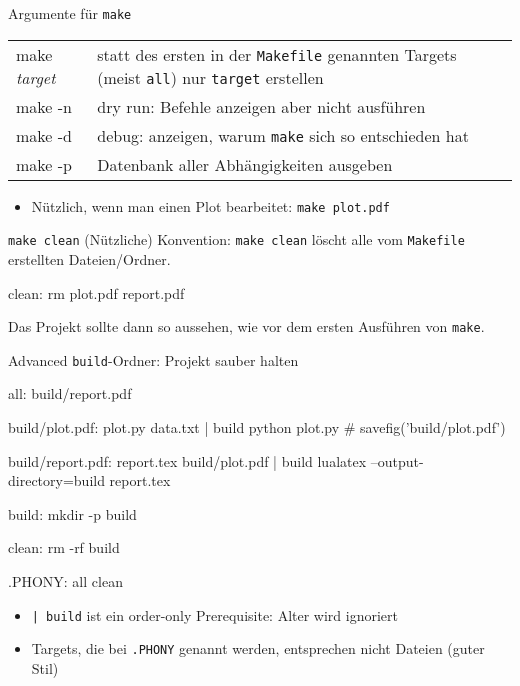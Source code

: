 \begin{frame}[fragile]{Argumente für \texttt{make}}
  \begin{tabu}{>{\ttfamily}l X[,L]}
    make \textit{target} & statt des ersten in der \texttt{Makefile} genannten Targets (meist \texttt{all}) nur \texttt{target} erstellen \\
    make -n              & dry run: Befehle anzeigen aber nicht ausführen \\
    make -d              & debug: anzeigen, warum \texttt{make} sich so entschieden hat \\
    make -p              & Datenbank aller Abhängigkeiten ausgeben
  \end{tabu}
  \begin{itemize}
    \item Nützlich, wenn man einen Plot bearbeitet: \texttt{make plot.pdf}
  \end{itemize}
\end{frame}

\begin{frame}[fragile]{\texttt{make clean}}
  (Nützliche) Konvention: \texttt{make clean} löscht alle vom \texttt{Makefile} erstellten Dateien/Ordner.

  \begin{center}
    \begin{lstmake}
      clean:
          rm plot.pdf report.pdf
    \end{lstmake}
  \end{center}

  Das Projekt sollte dann so aussehen, wie vor dem ersten Ausführen von \texttt{make}.
\end{frame}

\begin{frame}[fragile]{Advanced}
  \texttt{build}-Ordner: Projekt sauber halten

  \begin{center}
    \begin{lstmake}
      all: build/report.pdf

      build/plot.pdf: plot.py data.txt | build
          python plot.py  # savefig('build/plot.pdf')

      build/report.pdf: report.tex build/plot.pdf | build
          lualatex --output-directory=build report.tex

      build:
          mkdir -p build

      clean:
          rm -rf build

      .PHONY: all clean
    \end{lstmake}
  \end{center}

  \begin{itemize}
    \item \texttt{| build} ist ein order-only Prerequisite: Alter wird ignoriert
    \item Targets, die bei \texttt{.PHONY} genannt werden, entsprechen nicht Dateien (guter Stil)
  \end{itemize}
\end{frame}

